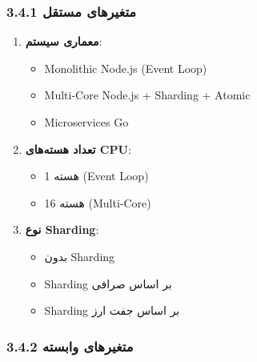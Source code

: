 \documentclass[
]{article}
\providecommand{\tightlist}{%
  \setlength{\itemsep}{0pt}\setlength{\parskip}{0pt}}
\begin{document}
\subsubsection{3.4.1 متغیرهای
مستقل}\label{ux645ux62aux63aux6ccux631ux647ux627ux6cc-ux645ux633ux62aux642ux644}

\begin{enumerate}
\def\labelenumi{\arabic{enumi}.}
\item
  \textbf{معماری سیستم}:

  \begin{itemize}
  \tightlist
  \item
    Monolithic Node.js (Event Loop)
  \item
    Multi-Core Node.js + Sharding + Atomic
  \item
    Microservices Go
  \end{itemize}
\item
  \textbf{تعداد هسته‌های CPU}:

  \begin{itemize}
  \tightlist
  \item
    1 هسته (Event Loop)
  \item
    16 هسته (Multi-Core)
  \end{itemize}
\item
  \textbf{نوع Sharding}:

  \begin{itemize}
  \tightlist
  \item
    بدون Sharding
  \item
    Sharding بر اساس صرافی
  \item
    Sharding بر اساس جفت ارز
  \end{itemize}
\end{enumerate}

\subsubsection{3.4.2 متغیرهای
وابسته}\label{ux645ux62aux63aux6ccux631ux647ux627ux6cc-ux648ux627ux628ux633ux62aux647}
\end{document}
